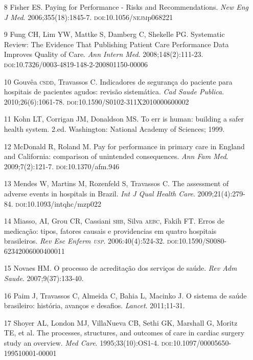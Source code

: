 \documentclass{article}
\begin{document}
\begin{itemize}
\item[8] Fisher ES. Paying for Performance - Risks and Recommendations.
\textit{New
Eng J Med}. 2006;355(18):1845-7. \textsc{doi}:10.1056/\textsc{nejm}p068221

\item[9] Fung CH, Lim YW, Mattke S, Damberg C, Shekelle PG. Systematic Review:
The
Evidence That Publishing Patient Care Performance Data Improves Quality of Care.
\textit{Ann Intern Med}. 2008;148(2):111-23.
\textsc{doi}:10.7326/0003-4819-148-2-200801150-00006

\item[10] Gouvêa \textsc{csdd}, Travassos C. Indicadores de segurança do paciente para
hospitais de pacientes agudos: revisão sistemática. \textit{Cad Saude Publica}.
2010;26(6):1061-78. \textsc{doi}:10.1590/S0102-311X2010000600002

\item[11] Kohn LT, Corrigan JM, Donaldson MS. To err is human: building a
safer
health system. 2.ed. Washington: National Academy of Sciences; 1999.

\item[12] McDonald R, Roland M. Pay for performance in primary care in England
and
California: comparison of unintended consequences. \textit{Ann Fam Med}.
2009;7(2):121-7. \textsc{doi}:10.1370/afm.946

\item[13] Mendes W, Martins M, Rozenfeld S, Travassos C. The assessment of
adverse
events in hospitals in Brazil. \textit{Int J Qual Health Care}.
2009;21(4):279-84. \textsc{doi}:10.1093/intqhc/mzp022

\item[14] Miasso, AI, Grou CR, Cassiani \textsc{shb}, Silva \textsc{aebc}, Fakih FT. Erros de
medicação: tipos, fatores causais e providencias em quatro hospitais
brasileiros.
\textit{Rev Esc Enferm \textsc{usp}}. 2006:40(4):524-32.
\textsc{doi}:10.1590/S0080-62342006000400011

\item[15] Novaes HM. O processo de acreditação dos serviços de saúde.
\textit{Rev
Adm Saude}. 2007;9(37):133-40.

\item[16] Paim J, Travassos C, Almeida C, Bahia L, Macinko J. O sistema de
saúde
brasileiro: história, avanços e desafios. \textit{Lancet}.
2011;11-31.

\item[17] Shoyer AL, London MJ, VillaNueva CB, Sethi GK, Marshall G, Moritz
TE, et
al. The processes, structures, and outcomes of care in cardiac surgery study an
overview.
\textit{Med Care}. 1995;33(10):OS1-4.
\textsc{doi}:10.1097/00005650-199510001-00001


\end{itemize}
\end{document}
